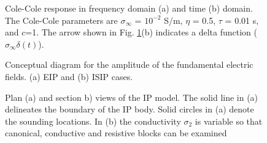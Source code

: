 \documentclass[extra,mreferee]{gji}
\newcommand{\siginf}{\sigma_\infty}
\begin{document}
\clearpage

\begin{figure}
  \caption{Cole-Cole response in frequency domain (a) and time (b) domain. The Cole-Cole parameters are $\siginf$ = $10^{-2}$ S/m, $\eta $ = 0.5, $\tau$ = 0.01 s, and $c$=1. The arrow shown in Fig. \ref{Fig:FDandTDCole}(b) indicates a delta function ($\siginf \delta(t)$). }
  \label{Fig:FDandTDCole}
\end{figure}

\begin{figure}
  \caption{Conceptual diagram for the amplitude of the fundamental electric fields. (a) EIP and (b) ISIP cases.}
  \label{F:DCEM_F_current}
\end{figure}

\begin{figure}
  \caption{Plan (a) and section b) views of the IP model. The solid line in (a) delineates the boundary of the IP body. Solid circles in (a) denote the sounding locations. In (b) the conductivity $\sigma_2$ is variable so that  canonical, conductive and resistive blocks can be examined}
  \label{F: IPModel}
\end{figure}
\end{document}
